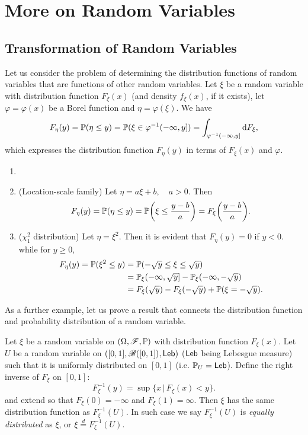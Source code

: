 \section{More on Random Variables}
\subsection{Transformation of Random Variables}
Let us consider the problem of determining the distribution functions of random variables that are functions of other random variables. Let $\xi$ be a random variable with distribution function $F_\xi(x)$ (and density $f_\xi(x)$, if it exists), let $\varphi = \varphi(x)$ be a Borel function and $\eta = \varphi(\xi)$. We have
\begin{align}
    F_\eta(y) = \mathbb{P}(\eta \le y) = \mathbb{P}(\xi \in \varphi^{-1}(-\infty, y]) = \int_{\varphi^{-1}(-\infty,y]} \mathrm{d} F_{\xi},
\end{align}
which expresses the distribution function $F_\eta(y)$ in terms of $F_\xi(x)$ and $\varphi$.
\begin{example}
\begin{enumerate}
    \item[]
    \item (Location-scale family) Let $\eta = a\xi + b, \quad a>0$. Then 
    \begin{equation}
        F_\eta (y) = \mathbb{P}(\eta \le y) = \mathbb{P}\bigg(\xi \le \frac{y-b}{a}\bigg) = F_\xi\bigg(\frac{y-b}{a}\bigg).
    \end{equation}
    \item ($\chi^2_1$ distribution) Let $\eta = \xi^2$. Then it is evident that $F_\eta (y) = 0$ if $y<0$. while for $y \ge 0$,
    \begin{align*}
        F_\eta(y) = \mathbb{P}(\xi^2 \le y) &= \mathbb{P}(-\sqrt{y} \le \xi \le \sqrt{y})\\ &= \mathbb{P}_\xi(-\infty, \sqrt{y}] - \mathbb{P}_\xi (-\infty, -\sqrt{y})\\
        &= F_\xi (\sqrt{y}) - F_\xi(-\sqrt{y}) + \mathbb{P}(\xi = -\sqrt{y}).
    \end{align*}
\end{enumerate}
\end{example}

As a further example, let us prove a result that connects the distribution function and probability distribution of a random variable.
\begin{proposition} \label{prop:prob_transform}
Let $\xi$ be a random variable on $(\Omega,\mathcal{F},\mathbb{P})$ with distribution function $F_\xi(x)$. Let $U$ be a random variable on $([0,1], \mathcal{B}([0,1]), \mathsf{Leb})$ ($\mathsf{Leb}$ being Lebesgue measure) such that it is uniformly distributed on $[0,1]$ (i.e. $\mathbb{P}_U = \mathsf{Leb}$). Define the right inverse of $F_\xi$ on $[0,1]$:
\begin{equation} \label{eq:right_inverse}
    F^{-1}_\xi(y) = \sup \{ x \,|\, F_\xi(x) < y \}.
\end{equation}
and extend so that $F_\xi(0)=-\infty$ and $F_\xi(1) = \infty$. Then $\xi$ has the same distribution function as $F_\xi^{-1}(U)$. In such case we say $F_\xi^{-1}(U)$ is \textit{equally distributed} as $\xi$, or $\xi \overset{d}{=} F_\xi^{-1}(U)$.
\end{proposition}

